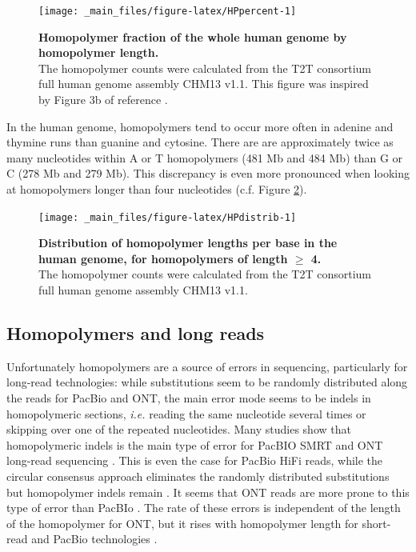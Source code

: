 \documentclass[
  11pt,
  twoside,
  BCOR=10mm,
  listof=totoc]{scrbook}
\begin{document}
\begin{figure}

{\centering \texttt{[image: \_main\_files/figure-latex/HPpercent-1]} 

}

\caption[Homopolymer fraction of the whole human genome by homopolymer length.]{\textbf{Homopolymer fraction of the whole human genome by homopolymer length.}\\The homopolymer counts were calculated from the T2T consortium full human genome assembly CHM13 v1.1. This figure was inspired by Figure 3b of reference \autocite{booeshaghiPseudoalignmentFacilitatesAssignment2022}.}\label{fig:HPpercent}
\end{figure}

In the human genome, homopolymers tend to occur more often in adenine and thymine runs than guanine and cytosine. There are are approximately twice as many nucleotides within A or T homopolymers (481 Mb and 484 Mb) than G or C (278 Mb and 279 Mb). This discrepancy is even more pronounced when looking at homopolymers longer than four nucleotides (c.f. Figure \ref{fig:HPdistrib}).

\begin{figure}

{\centering \texttt{[image: \_main\_files/figure-latex/HPdistrib-1]} 

}

\caption[Distribution of homopolymer lengths per base in the human genome, for homopolymers of length $\geq$ 4.]{\textbf{Distribution of homopolymer lengths per base in the human genome, for homopolymers of length $\geq$ 4.}\\The homopolymer counts were calculated from the T2T consortium full human genome assembly CHM13 v1.1.}\label{fig:HPdistrib}
\end{figure}

\hypertarget{homopolymers-and-long-reads}{%
\subsection{Homopolymers and long reads}\label{homopolymers-and-long-reads}}

Unfortunately homopolymers are a source of errors in sequencing, particularly for long-read technologies: while substitutions seem to be randomly distributed along the reads for PacBio and ONT, the main error mode seems to be indels in homopolymeric sections, \emph{i.e.} reading the same nucleotide several times or skipping over one of the repeated nucleotides. Many studies show that homopolymeric indels is the main type of error for PacBIO SMRT and ONT long-read sequencing \autocite{delahaye2021,goodwin2015,dohmBenchmarkingLongreadCorrection2020,weirather2017}. This is even the case for PacBio HiFi reads, while the circular consensus approach eliminates the randomly distributed substitutions but homopolymer indels remain \autocite{wenger2019}. It seems that ONT reads are more prone to this type of error than PacBIo \autocite{logsdonLongreadHumanGenome2020}. The rate of these errors is independent of the length of the homopolymer for ONT, but it rises with homopolymer length for short-read and PacBio technologies \autocite{fooxPerformanceAssessmentDNA2021}.
\end{document}
